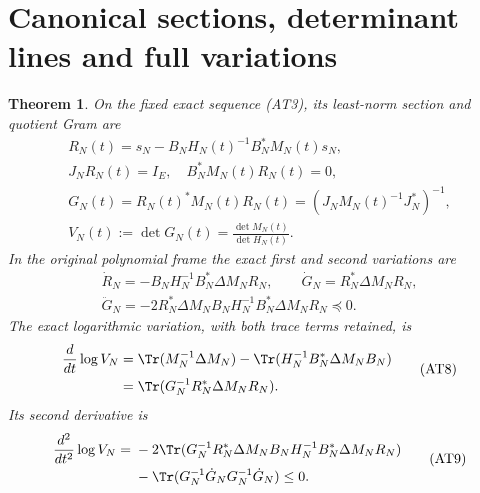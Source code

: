 \documentclass[10pt,a4paper,oneside]{report}
\newtheorem{theorem}{Theorem}[chapter]
\begin{document}
\section{Canonical sections, determinant lines and full variations}

\begin{theorem}
On the fixed exact sequence (AT3), its least-norm section and quotient
Gram are
\[
 \begin{gathered}
 R_N(t)=s_N-B_NH_N(t)^{-1}B_N^*M_N(t)s_N,\\
 J_NR_N(t)=I_E,\quad B_N^*M_N(t)R_N(t)=0,\\
 G_N(t)=R_N(t)^*M_N(t)R_N(t)
       =(J_NM_N(t)^{-1}J_N^*)^{-1},\\
 V_N(t):=\det G_N(t)=\frac{\det M_N(t)}{\det H_N(t)}.
                                                        \tag{AT6}
 \end{gathered}
\]
In the original polynomial frame the exact first and second variations
are
\[
 \begin{gathered}
 \dot R_N=-B_NH_N^{-1}B_N^*\Delta M_NR_N,\qquad
 \dot G_N=R_N^*\Delta M_NR_N,\\
 \ddot G_N=-2R_N^*\Delta M_NB_NH_N^{-1}B_N^*\Delta M_NR_N
            \preceq0.                                \tag{AT7}
 \end{gathered}
\]
The exact logarithmic variation, with both trace terms retained, is
\[
 \begin{split}
 \frac{d}{dt}\log V_N
 &=\Tr(M_N^{-1}\Delta M_N)
   -\Tr(H_N^{-1}B_N^*\Delta M_NB_N)\\
 &=\Tr(G_N^{-1}R_N^*\Delta M_NR_N).             
 \end{split}\tag{AT8}
\]
Its second derivative is
\[
 \begin{split}
 \frac{d^2}{dt^2}\log V_N
 ={}&-2\Tr(G_N^{-1}R_N^*\Delta M_NB_NH_N^{-1}
                         B_N^*\Delta M_NR_N)\\
    &-\Tr(G_N^{-1}\dot G_NG_N^{-1}\dot G_N)\le0.
 \end{split}\tag{AT9}
\]
\end{theorem}
\end{document}
